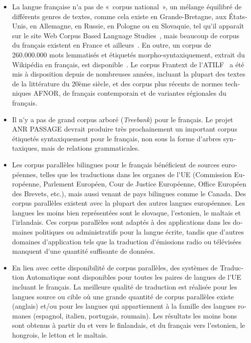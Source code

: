 \documentclass[]{../metanetpaper}
\begin{document}
\begin{french}
\begin{multicols}{2}
\begin{itemize}
\item La langue française n{\mbox '}a pas de «~corpus national~», un mélange équilibré
de différents genres de textes, comme cela existe en Grande-Bretagne,
aux États-Unis, en Allemagne, en Russie, en Pologne ou en Slovaquie,
tel qu{\mbox '}il apparaît sur le site Web Corpus Based Language Studies~\cite{corpuslangstud},
mais beaucoup de corpus du français existent en France et
ailleurs~\cite{corpusfr}. En outre, un corpus de 260.000.000 mots lemmatisés et
étiquetés morpho-syntaxiquement, extrait du Wikipédia en français, est
disponible~\cite{wikipediafr}. Le corpus Frantext de l{\mbox '}ATILF~\cite{atilf} a été mis à disposition
depuis de nombreuses années, incluant la plupart des textes de la
littérature du 20ème siècle, et des corpus plus récents de normes
techniques AFNOR, de français contemporain et de variantes régionales
du français.

\item Il n{\mbox '}y a pas de grand corpus arboré ({\em Treebank}) pour le français. Le projet ANR PASSAGE
devrait produire très prochainement un important corpus étiquetés
syntaxiquement pour le français, non sous la forme d{\mbox '}arbres
syntaxiques, mais de relations grammaticales.

\item Les corpus parallèles bilingues pour le français bénéficient de
sources européennes, telles que les traductions dans les organes de
l{\mbox '}UE (Commission Européenne, Parlement Européen, Cour de Justice
Européenne, Office Européen des Brevets, etc.), mais aussi venant de
pays bilingues comme le Canada. Des corpus parallèles existent avec la
plupart des autres langues européennes. Les langues les moins bien représentées
sont le slovaque, l{\mbox '}estonien, le maltais et l{\mbox '}irlandais. Ces
corpus parallèles sont adaptés à des applications dans les domaines
politiques ou administratifs pour la langue écrite, tandis que
d{\mbox '}autres domaines d{\mbox '}application tels que la traduction d{\mbox '}émissions
radio ou télévisées manquent d{\mbox '}une quantité suffisante de données.

\item En lien avec cette disponibilité de corpus parallèles, des systèmes de
Traduction Automatique sont disponibles pour toutes les paires de
langues de l{\mbox '}UE incluant le français. La meilleure qualité de
traduction est réalisée pour les langues source ou cible où une grande
quantité de corpus parallèles existe (anglais) et/ou pour les langues
qui appartiennent à la famille des langues romanes (espagnol, italien,
portugais, roumain). Les résultats les moins bons sont obtenus à partir du et
vers le finlandais, et du français vers l{\mbox '}estonien, le hongrois, le
letton et le maltais.


\end{itemize}
\end{multicols}
\end{french}
\end{document}
